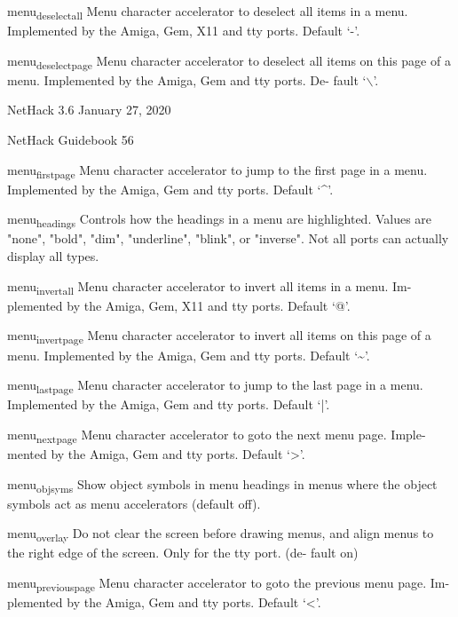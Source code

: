 \documentclass[11pt]{article}
\begin{document}
menu\textsubscript{deselect}\textsubscript{all}
 Menu character accelerator to deselect all items in a menu.
 Implemented by the Amiga, Gem, X11 and tty ports. Default `-'.

menu\textsubscript{deselect}\textsubscript{page}
 Menu character accelerator to deselect all items on this page
 of a menu. Implemented by the Amiga, Gem and tty ports.  De-
 fault `$\backslash$'.


NetHack 3.6                   January 27, 2020





NetHack Guidebook                       56



menu\textsubscript{first}\textsubscript{page}
 Menu character accelerator to jump to the first page in a menu.
 Implemented by the Amiga, Gem and tty ports. Default `\^{}'.

menu\textsubscript{headings}
 Controls how the headings in a menu are highlighted.  Values
 are "none", "bold", "dim", "underline", "blink", or "inverse".
 Not all ports can actually display all types.

menu\textsubscript{invert}\textsubscript{all}
 Menu character accelerator to invert all items in a menu.  Im-
 plemented by the Amiga, Gem, X11 and tty ports. Default `@'.

menu\textsubscript{invert}\textsubscript{page}
 Menu character accelerator to invert all items on this page of
 a menu. Implemented by the Amiga, Gem and tty ports.  Default
 `\textasciitilde{}'.

menu\textsubscript{last}\textsubscript{page}
 Menu character accelerator to jump to the last page in a menu.
 Implemented by the Amiga, Gem and tty ports. Default `|'.

menu\textsubscript{next}\textsubscript{page}
 Menu character accelerator to goto the next menu page.  Imple-
 mented by the Amiga, Gem and tty ports. Default `>'.

menu\textsubscript{objsyms}
 Show object symbols in menu headings in menus where the object
 symbols act as menu accelerators (default off).

menu\textsubscript{overlay}
 Do not clear the screen before drawing menus, and align menus
 to the right edge of the screen. Only for the tty port. (de-
 fault on)

menu\textsubscript{previous}\textsubscript{page}
 Menu character accelerator to goto the previous menu page. Im-
 plemented by the Amiga, Gem and tty ports. Default `<'.
\end{document}
